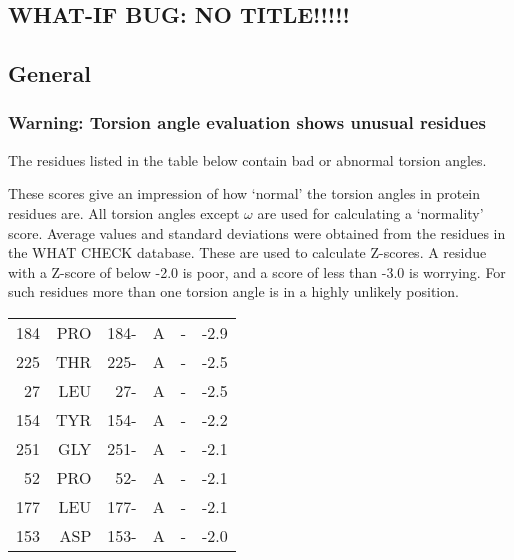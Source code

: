 \documentclass[a4paper]{article}
\def\showsect#1{
  \thesect\gdef\thesect{}
  \thessect\gdef\thessect{}
  \subsubsection{#1}
}
\gdef\thesect{\pagebreak[2]\section{WHAT-IF BUG: NO TITLE!!!!!}}
\gdef\thessect{\subsection{General}}
\begin{document}
\begin{warning}
\showsect{Warning: Torsion angle evaluation shows unusual residues}
The residues listed in the table below contain bad or abnormal
torsion angles.
 
These scores give an impression of how `normal' the torsion angles in
protein residues are. All torsion angles except $\omega$ are used for
calculating a `normality' score. Average values and standard deviations were
obtained from the residues in the WHAT CHECK database. These are used to
calculate Z-scores. A residue with a Z-score of below -2.0 is poor, and a
score of less than -3.0 is worrying. For such residues more than one torsion
angle is in a highly unlikely position.
 
\begin{center}
 
\begin{supertabular}{rr@{ (}r@{) }rl@{ }l}
  184&PRO & 184-&A &-&  -2.9\\
  225&THR & 225-&A &-&  -2.5\\
   27&LEU &  27-&A &-&  -2.5\\
  154&TYR & 154-&A &-&  -2.2\\
  251&GLY & 251-&A &-&  -2.1\\
   52&PRO &  52-&A &-&  -2.1\\
  177&LEU & 177-&A &-&  -2.1\\
  153&ASP & 153-&A &-&  -2.0\\
\end{supertabular}\end{center}
\end{warning}
\end{document}
